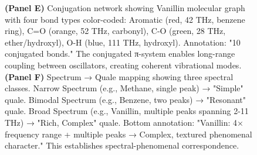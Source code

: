 \begin{figure}[htbp]
{\textbf{(Panel E)} Conjugation network showing Vanillin molecular graph with four bond types color-coded: Aromatic (red, 42 THz, benzene ring), C=O (orange, 52 THz, carbonyl), C-O (green, 28 THz, ether/hydroxyl), O-H (blue, 111 THz, hydroxyl). Annotation: "10 conjugated bonds." The conjugated π-system enables long-range coupling between oscillators, creating coherent vibrational modes.
\textbf{(Panel F)} Spectrum → Quale mapping showing three spectral classes. Narrow Spectrum (e.g., Methane, single peak) → "Simple" quale. Bimodal Spectrum (e.g., Benzene, two peaks) → "Resonant" quale. Broad Spectrum (e.g., Vanillin, multiple peaks spanning 2-11 THz) → "Rich, Complex" quale. Bottom annotation: "Vanillin: 4× frequency range + multiple peaks → Complex, textured phenomenal character." This establishes spectral-phenomenal correspondence.

}
\label{fig:vibrational_landscape}
\end{figure}

